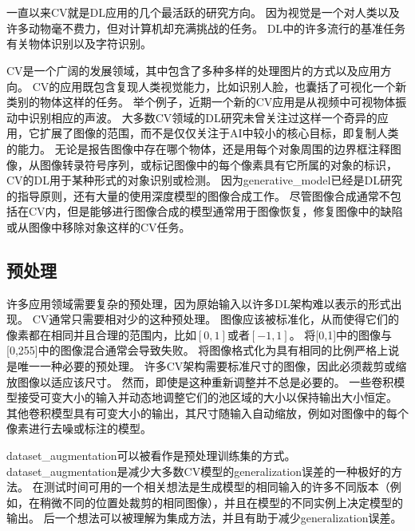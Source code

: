 \section{}
\label{sec:computer_vision}

一直以来\gls{CV}就是\gls{DL}应用的几个最活跃的研究方向。
因为视觉是一个对人类以及许多动物毫不费力，但对计算机却充满挑战的任务\citep{ballard1983parallel}。
\gls{DL}中的许多流行的基准任务有关物体识别以及字符识别。


\gls{CV}是一个广阔的发展领域，其中包含了多种多样的处理图片的方式以及应用方向。
\gls{CV}的应用既包含复现人类视觉能力，比如识别人脸，也囊括了可视化一个新类别的物体这样的任务。
举个例子，近期一个新的\gls{CV}应用是从视频中可视物体振动中识别相应的声波\citep{Davis2014VisualMic}。
大多数\gls{CV}领域的\gls{DL}研究未曾关注过这样一个奇异的应用，它扩展了图像的范围，而不是仅仅关注于\gls{AI}中较小的核心目标，即复制人类的能力。
无论是报告图像中存在哪个物体，还是用每个对象周围的边界框注释图像，从图像转录符号序列，或标记图像中的每个像素具有它所属的对象的标识，\gls{CV}的\gls{DL}用于某种形式的对象识别或检测。
因为\gls{generative_model}已经是\gls{DL}研究的指导原则，还有大量的使用深度模型的图像合成工作。
尽管图像合成通常不包括在\gls{CV}内，但是能够进行图像合成的模型通常用于图像恢复，修复图像中的缺陷或从图像中移除对象这样的\gls{CV}任务。

\subsection{预处理}
\label{sec:preprocessing}

许多应用领域需要复杂的预处理，因为原始输入以许多\gls{DL}架构难以表示的形式出现。
\gls{CV}通常只需要相对少的这种预处理。
图像应该被标准化，从而使得它们的像素都在相同并且合理的范围内，比如$[0,1]$或者$[-1,1]$。
将[0,1]中的图像与[0,255]中的图像混合通常会导致失败。
将图像格式化为具有相同的比例严格上说是唯一一种必要的预处理。
许多\gls{CV}架构需要标准尺寸的图像，因此必须裁剪或缩放图像以适应该尺寸。
然而，即使是这种重新调整并不总是必要的。
一些卷积模型接受可变大小的输入并动态地调整它们的池区域的大小以保持输出大小恒定\citep{Waibel89b}。
其他卷积模型具有可变大小的输出，其尺寸随输入自动缩放，例如对图像中的每个像素进行去噪或标注的模型\citep{Hadsell-RSS-07}。

\gls{dataset_augmentation}可以被看作是预处理训练集的方式。
\gls{dataset_augmentation}是减少大多数\gls{CV}模型的\gls{generalization}误差的一种极好的方法。
在测试时间可用的一个相关想法是生成模型的相同输入的许多不同版本（例如，在稍微不同的位置处裁剪的相同图像），并且在模型的不同实例上决定模型的输出。
后一个想法可以被理解为集成方法，并且有助于减少\gls{generalization}误差。

